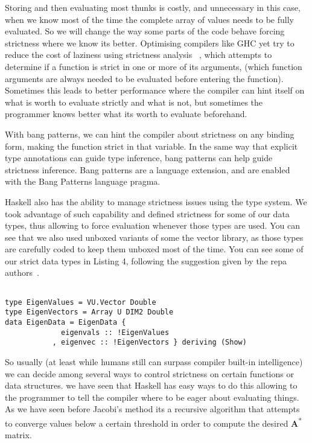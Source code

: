 \documentclass{tmr}
\begin{document}
Storing and then evaluating most thunks is costly, and unnecessary in this case, when we know 
most of the time the complete array of values needs to be fully evaluated. So we will change the
way some parts of the code behave forcing strictness where we know its better.
Optimising compilers like GHC yet try to reduce the cost of laziness using strictness analysis
 ~\cite{Strictness}, which attempts to determine if a function is strict in one or more of 
its arguments, (which function arguments are always needed to be evaluated before entering the function). 
Sometimes this leads to better performance where the compiler can hint itself on what is worth to evaluate
strictly and what is not, but sometimes the programmer knows better what its worth 
to evaluate beforehand.

With bang patterns, we can hint the compiler about strictness on any binding form, 
making the function strict in that variable. In the same way that explicit type annotations can 
guide type inference, bang patterns can help guide strictness inference. Bang patterns 
are a language extension, and are enabled with the Bang Patterns language pragma.

Haskell also has the ability to manage strictness issues using the type system. We took advantage of such 
capability and defined strictness for some of our data types, thus allowing to force evaluation whenever
 those types are used. You can see that we also used unboxed variants of some the vector library,
as those types are carefully coded to keep them unboxed most of the time. You can see some of our strict data
types in Listing 4, following the suggestion given by the repa authors~\cite{bang}.

\begin{lstlisting}[float,captionpos=b,belowcaptionskip=4pt, caption= Strict data types for eigenvalue operations]

type EigenValues = VU.Vector Double
type EigenVectors = Array U DIM2 Double
data EigenData = EigenData {
             eigenvals :: !EigenValues
           , eigenvec :: !EigenVectors } deriving (Show)

\end{lstlisting}

So usually (at least while humans still can surpass compiler built-in intelligence) we can decide among several 
ways to control strictness on certain functions or data structures. we have seen that Haskell has easy ways to do
 this allowing to the programmer to tell the compiler where to be eager 
about evaluating things. As we have seen before Jacobi's method its a recursive algorithm that
 attempts to converge values below a certain threshold 
in order to compute the desired {\textbf A\textsuperscript{*}} matrix.
\end{document}
